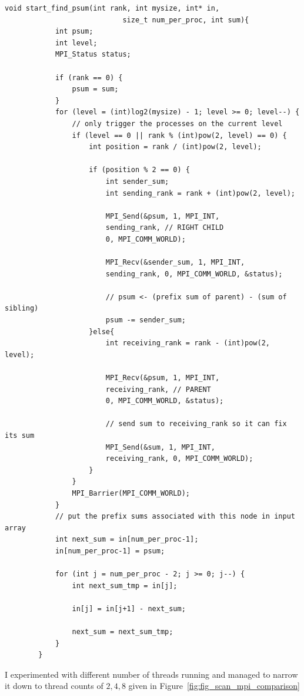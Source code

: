 	\begin{lstlisting}[caption={start\textunderscore find\textunderscore psum()}, label={listing:ls_findpsum}]
		void start_find_psum(int rank, int mysize, int* in,
							size_t num_per_proc, int sum){
			int psum;
			int level;
			MPI_Status status;  
			
			if (rank == 0) {
				psum = sum;
			}
			for (level = (int)log2(mysize) - 1; level >= 0; level--) {
				// only trigger the processes on the current level
				if (level == 0 || rank % (int)pow(2, level) == 0) {
					int position = rank / (int)pow(2, level);
					
					if (position % 2 == 0) {
						int sender_sum;
						int sending_rank = rank + (int)pow(2, level);
						
						MPI_Send(&psum, 1, MPI_INT,
						sending_rank, // RIGHT CHILD
						0, MPI_COMM_WORLD);
						
						MPI_Recv(&sender_sum, 1, MPI_INT,
						sending_rank, 0, MPI_COMM_WORLD, &status);

						// psum <- (prefix sum of parent) - (sum of sibling)
						psum -= sender_sum;
					}else{
						int receiving_rank = rank - (int)pow(2, level);
						
						MPI_Recv(&psum, 1, MPI_INT,
						receiving_rank, // PARENT
						0, MPI_COMM_WORLD, &status);
						
						// send sum to receiving_rank so it can fix its sum
						MPI_Send(&sum, 1, MPI_INT,
						receiving_rank, 0, MPI_COMM_WORLD);
					}
				}
				MPI_Barrier(MPI_COMM_WORLD);
			}
			// put the prefix sums associated with this node in input array
			int next_sum = in[num_per_proc-1];
			in[num_per_proc-1] = psum;
			
			for (int j = num_per_proc - 2; j >= 0; j--) {
				int next_sum_tmp = in[j];
				
				in[j] = in[j+1] - next_sum;
				
				next_sum = next_sum_tmp;
			}
		}
	\end{lstlisting}
	
	I experimented with different number of threads running and managed to narrow it down to thread counts of $2,4,8$ given in Figure~\ref{fig:fig_scan_mpi_comparison}
	
